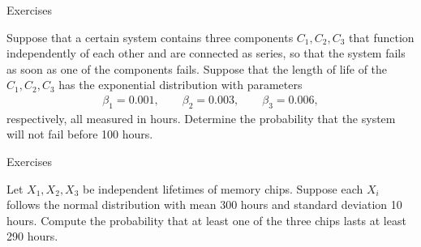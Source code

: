 \begin{frame}{Exercises}

\justifying
{} Suppose that a certain system contains three components $C_1, C_2, C_3$ that function independently of each other and are connected as series, so that the system fails as soon as one of the components fails. Suppose that the length of life of the $C_1, C_2, C_3$ has the exponential distribution with parameters
\begin{align*}
\beta_1 = 0.001, \qquad \beta_2 = 0.003, \qquad \beta_3 = 0.006,
\end{align*}
respectively, all measured in hours. Determine the probability that the system will not fail before 100 hours.

\end{frame}


\begin{frame}{Exercises}

\justifying
{} Let $X_1, X_2, X_3$ be independent lifetimes of memory chips. Suppose each $X_i$ follows the normal distribution with mean 300 hours and standard deviation 10 hours. Compute the probability that at least one of the three chips lasts at least 290 hours.

\end{frame}
